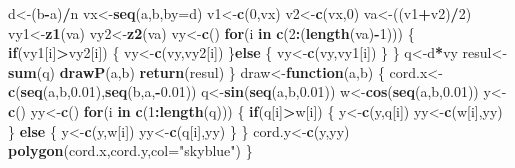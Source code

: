 \documentclass[]{article}
\newenvironment{Shaded}{\begin{snugshade}}{\end{snugshade}}
\newcommand{\KeywordTok}[1]{\textcolor[rgb]{0.13,0.29,0.53}{\textbf{#1}}}
\newcommand{\DataTypeTok}[1]{\textcolor[rgb]{0.13,0.29,0.53}{#1}}
\newcommand{\DecValTok}[1]{\textcolor[rgb]{0.00,0.00,0.81}{#1}}
\newcommand{\FloatTok}[1]{\textcolor[rgb]{0.00,0.00,0.81}{#1}}
\newcommand{\StringTok}[1]{\textcolor[rgb]{0.31,0.60,0.02}{#1}}
\newcommand{\ControlFlowTok}[1]{\textcolor[rgb]{0.13,0.29,0.53}{\textbf{#1}}}
\newcommand{\OperatorTok}[1]{\textcolor[rgb]{0.81,0.36,0.00}{\textbf{#1}}}
\newcommand{\NormalTok}[1]{#1}
\begin{document}
\begin{Shaded}
\begin{Highlighting}[]
\NormalTok{  d<-(b}\OperatorTok{-}\NormalTok{a)}\OperatorTok{/}\NormalTok{n}
\NormalTok{  vx<-}\KeywordTok{seq}\NormalTok{(a,b,}\DataTypeTok{by=}\NormalTok{d)}
\NormalTok{  v1<-}\KeywordTok{c}\NormalTok{(}\DecValTok{0}\NormalTok{,vx)}
\NormalTok{  v2<-}\KeywordTok{c}\NormalTok{(vx,}\DecValTok{0}\NormalTok{)}
\NormalTok{  va<-((v1}\OperatorTok{+}\NormalTok{v2)}\OperatorTok{/}\DecValTok{2}\NormalTok{)}
\NormalTok{  vy1<-}\KeywordTok{z1}\NormalTok{(va)}
\NormalTok{  vy2<-}\KeywordTok{z2}\NormalTok{(va)}
\NormalTok{  vy<-}\KeywordTok{c}\NormalTok{()}
  \ControlFlowTok{for}\NormalTok{(i }\ControlFlowTok{in} \KeywordTok{c}\NormalTok{(}\DecValTok{2}\OperatorTok{:}\NormalTok{(}\KeywordTok{length}\NormalTok{(va)}\OperatorTok{-}\DecValTok{1}\NormalTok{)))}
\NormalTok{  \{}
    \ControlFlowTok{if}\NormalTok{(vy1[i]}\OperatorTok{>}\NormalTok{vy2[i])}
\NormalTok{    \{}
\NormalTok{      vy<-}\KeywordTok{c}\NormalTok{(vy,vy2[i])}
\NormalTok{    \}}\ControlFlowTok{else}
\NormalTok{    \{}
\NormalTok{      vy<-}\KeywordTok{c}\NormalTok{(vy,vy1[i])}
\NormalTok{    \}}
\NormalTok{  \}}
\NormalTok{  q<-d}\OperatorTok{*}\NormalTok{vy}
\NormalTok{  resul<-}\KeywordTok{sum}\NormalTok{(q)}
  \KeywordTok{drawP}\NormalTok{(a,b)}
  \KeywordTok{return}\NormalTok{(resul)}
\NormalTok{\}}
\NormalTok{draw<-}\ControlFlowTok{function}\NormalTok{(a,b)}
\NormalTok{\{}
\NormalTok{  cord.x<-}\KeywordTok{c}\NormalTok{(}\KeywordTok{seq}\NormalTok{(a,b,}\FloatTok{0.01}\NormalTok{),}\KeywordTok{seq}\NormalTok{(b,a,}\OperatorTok{-}\FloatTok{0.01}\NormalTok{))}
\NormalTok{  q<-}\KeywordTok{sin}\NormalTok{(}\KeywordTok{seq}\NormalTok{(a,b,}\FloatTok{0.01}\NormalTok{))}
\NormalTok{  w<-}\KeywordTok{cos}\NormalTok{(}\KeywordTok{seq}\NormalTok{(a,b,}\FloatTok{0.01}\NormalTok{))}
\NormalTok{  y<-}\KeywordTok{c}\NormalTok{()}
\NormalTok{  yy<-}\KeywordTok{c}\NormalTok{()}
  \ControlFlowTok{for}\NormalTok{(i }\ControlFlowTok{in} \KeywordTok{c}\NormalTok{(}\DecValTok{1}\OperatorTok{:}\KeywordTok{length}\NormalTok{(q)))}
\NormalTok{  \{}
    \ControlFlowTok{if}\NormalTok{(q[i]}\OperatorTok{>}\NormalTok{w[i])}
\NormalTok{    \{}
\NormalTok{      y<-}\KeywordTok{c}\NormalTok{(y,q[i])}
\NormalTok{      yy<-}\KeywordTok{c}\NormalTok{(w[i],yy)}
\NormalTok{    \}}
    \ControlFlowTok{else}
\NormalTok{    \{}
\NormalTok{      y<-}\KeywordTok{c}\NormalTok{(y,w[i])}
\NormalTok{      yy<-}\KeywordTok{c}\NormalTok{(q[i],yy)}
\NormalTok{    \}}
\NormalTok{  \}}
\NormalTok{  cord.y<-}\KeywordTok{c}\NormalTok{(y,yy)}
  \KeywordTok{polygon}\NormalTok{(cord.x,cord.y,}\DataTypeTok{col=}\StringTok{"skyblue"}\NormalTok{)}
\NormalTok{\}}

\end{Highlighting}
\end{Shaded}
\end{document}
